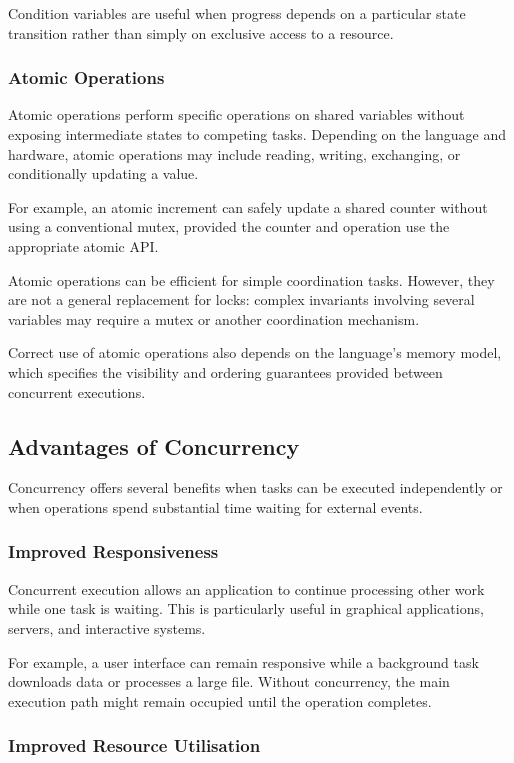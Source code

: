 Condition variables are useful when progress depends on a particular state transition rather than simply on exclusive access to a resource.

\subsubsection{Atomic Operations}

Atomic operations perform specific operations on shared variables without exposing intermediate states to competing tasks. Depending on the language and hardware, atomic operations may include reading, writing, exchanging, or conditionally updating a value.

For example, an atomic increment can safely update a shared counter without using a conventional mutex, provided the counter and operation use the appropriate atomic API.

Atomic operations can be efficient for simple coordination tasks. However, they are not a general replacement for locks: complex invariants involving several variables may require a mutex or another coordination mechanism.

Correct use of atomic operations also depends on the language's memory model, which specifies the visibility and ordering guarantees provided between concurrent executions.

\subsection{Advantages of Concurrency}

Concurrency offers several benefits when tasks can be executed independently or when operations spend substantial time waiting for external events.

\subsubsection{Improved Responsiveness}

Concurrent execution allows an application to continue processing other work while one task is waiting. This is particularly useful in graphical applications, servers, and interactive systems.

For example, a user interface can remain responsive while a background task downloads data or processes a large file. Without concurrency, the main execution path might remain occupied until the operation completes.

\subsubsection{Improved Resource Utilisation}

